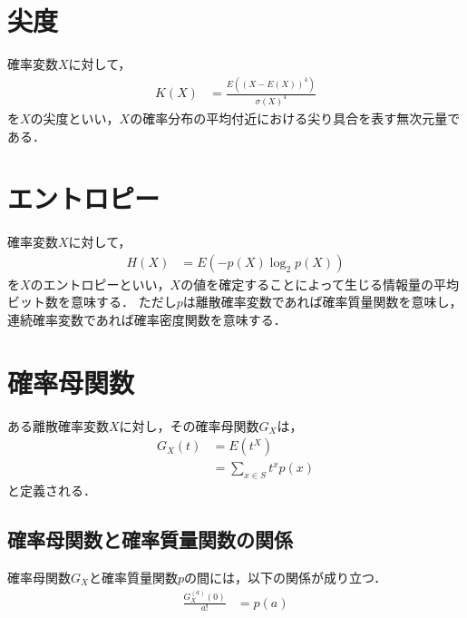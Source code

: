 \documentclass[dvipdfmx]{jsarticle}
\begin{document}
 \section{尖度}
確率変数$X$に対して，
 \begin{align}
  K\left(X\right)&=\frac{E\left(\left(X-E\left(X\right)\right)^4\right)}{\sigma\left(X\right)^4}
 \end{align}
を$X$の尖度といい，$X$の確率分布の平均付近における尖り具合を表す無次元量である．
 \section{エントロピー}
確率変数$X$に対して，
 \begin{align}
  H\left(X\right)&=E\left(-p\left(X\right)\log_2p\left(X\right)\right)
 \end{align}
を$X$のエントロピーといい，$X$の値を確定することによって生じる情報量の平均ビット数を意味する．
ただし$p$は離散確率変数であれば確率質量関数を意味し，連続確率変数であれば確率密度関数を意味する．
 \section{確率母関数}
ある離散確率変数$X$に対し，その確率母関数$G_X$は，
 \begin{align}
  G_X\left(t\right)&=E\left(t^X\right)\nonumber\\
  &=\sum_{x\in S}t^xp\left(x\right)
 \end{align}
と定義される．
 \subsection{確率母関数と確率質量関数の関係}
確率母関数$G_X$と確率質量関数$p$の間には，以下の関係が成り立つ．
 \begin{align}
  \frac{G_X^{\left(a\right)}\left(0\right)}{a!}&=p\left(a\right)
 \end{align}
\end{document}

